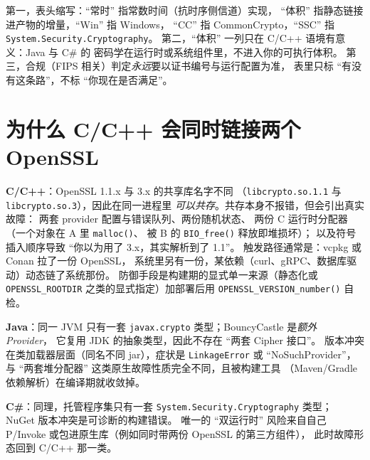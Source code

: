 \documentclass[12pt,a4paper,fontset=fandol]{ctexbook}
\newcommand{\Fn}[1]{\texttt{#1()}}
\newcommand{\Tp}[1]{\texttt{#1}}
\newcommand{\CSharp}{C\#}
\newcommand{\CppJava}{C/C++}
\begin{document}
\begin{note}[title=读这张表的三个提醒]
第一，表头缩写：``常时'' 指常数时间（抗时序侧信道）实现，
``体积'' 指静态链接进产物的增量，``Win'' 指 Windows，
``CC'' 指 CommonCrypto，``SSC'' 指
\Tp{System.\allowbreak Security.\allowbreak Cryptography}。
第二，``体积'' 一列只在 \CppJava{} 语境有意义：Java 与 \CSharp{} 的
密码学在运行时或系统组件里，不进入你的可执行体积。
第三，合规（FIPS 相关）判定\emph{永远}要以证书编号与运行配置为准，
表里只标 ``有没有这条路''，不标 ``你现在是否满足''。
\end{note}

\section{为什么 \CppJava{} 会同时链接两个 OpenSSL}

\begin{compare}[title=同进程两套密码学运行时：\CppJava{} 的常态，托管语言的罕见事故]
\textbf{\CppJava{}}：OpenSSL 1.1.x 与 3.x 的共享库名字不同
（\Tp{libcrypto.so.1.1} 与 \Tp{libcrypto.so.3}），因此在同一进程里
\emph{可以共存}。共存本身不报错，但会引出真实故障：
两套 provider 配置与错误队列、两份随机状态、
两份 C 运行时分配器（一个对象在 A 里 \Fn{malloc}、
被 B 的 \Fn{BIO\_free} 释放即堆损坏）；
以及符号插入顺序导致 ``你以为用了 3.x，其实解析到了 1.1''。
触发路径通常是：vcpkg 或 Conan 拉了一份 OpenSSL，
系统里另有一份，某依赖（curl、gRPC、数据库驱动）动态链了系统那份。
防御手段是构建期的显式单一来源（静态化或
\Tp{OPENSSL\_ROOTDIR} 之类的显式指定）加部署后用
\Fn{OPENSSL\_VERSION\_\allowbreak number} 自检。

\textbf{Java}：同一 JVM 只有一套
\Tp{javax.crypto} 类型；BouncyCastle 是\emph{额外 Provider}，
它复用 JDK 的抽象类型，因此不存在 ``两套 Cipher 接口''。
版本冲突在类加载器层面（同名不同 jar），症状是
\Tp{LinkageError} 或 ``NoSuchProvider''，
与 ``两套堆分配器'' 这类原生故障性质完全不同，且被构建工具
（Maven/Gradle 依赖解析）在编译期就收敛掉。

\textbf{\CSharp{}}：同理，托管程序集只有一套
\Tp{System.\allowbreak Security.\allowbreak Cryptography} 类型；
NuGet 版本冲突是可诊断的构建错误。
唯一的 ``双运行时'' 风险来自自己
P/Invoke 或包进原生库（例如同时带两份 OpenSSL 的第三方组件），
此时故障形态回到 \CppJava{} 那一类。
\end{compare}
\end{document}
